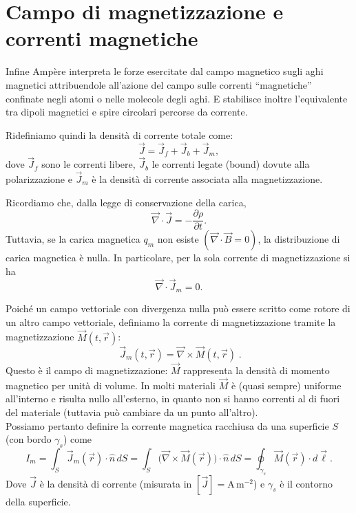 \documentclass{book}
\begin{document}
\section{Campo di magnetizzazione e correnti magnetiche}

Infine Ampère interpreta le forze esercitate dal campo magnetico sugli aghi magnetici attribuendole all'azione del campo sulle correnti ``magnetiche'' confinate negli atomi o nelle molecole degli aghi. E stabilisce inoltre l'equivalente tra dipoli magnetici e spire circolari percorse da corrente.

Ridefiniamo quindi la densità di corrente totale come:
\[
\vec{J} = \vec{J}_{\!f} + \vec{J}_{\!b} + \vec{J}_{\!m},
\]
dove \(\vec{J}_{\!f}\) sono le correnti libere, \(\vec{J}_{\!b}\) le correnti legate (bound) dovute alla polarizzazione e \(\vec{J}_{\!m}\) è la densità di corrente associata alla magnetizzazione.

Ricordiamo che, dalla legge di conservazione della carica,
\[
\vec{\nabla}\cdot\vec{J} = -\frac{\partial \rho}{\partial t}.
\]
Tuttavia, se la carica magnetica \(q_m\) non esiste $\left( \vec{\nabla} \cdot \vec{B}=0 \right)$, la distribuzione di carica magnetica è nulla. In particolare, per la sola corrente di magnetizzazione si ha
\[
\vec{\nabla}\cdot\vec{J}_{\!m} = 0.
\]

Poiché un campo vettoriale con divergenza nulla può essere scritto come rotore di un altro campo vettoriale, definiamo la corrente di magnetizzazione tramite la magnetizzazione \(\vec{M}(t,\vec{r})\):
\[
\boxed{\;\vec{J}_{\!m}(t,\vec{r}) = \vec{\nabla}\times\vec{M}(t,\vec{r})\;}.
\]
Questo è il campo di magnetizzazione: \(\vec{M}\) rappresenta la densità di momento magnetico per unità di volume. In molti materiali \(\vec{M}\) è (quasi sempre) uniforme all'interno e risulta nullo all'esterno, in quanto non si hanno correnti al di fuori del materiale (tuttavia può cambiare da un punto all'altro).
\\
Possiamo pertanto definire la corrente magnetica racchiusa da una superficie \(S\) (con bordo \(\gamma_s\)) come
\[
I_m = \int_{S}\vec{J}_{\!m}(\vec{r})\cdot\hat{n}\,dS
= \int_{S}\bigl(\vec{\nabla}\times\vec{M}(\vec{r})\bigr)\cdot\hat{n}\,dS
= \oint_{\gamma_s}\vec{M}(\vec{r})\cdot d\vec{\ell}.
\]
Dove \(\vec{J}\) è la densità di corrente (misurata in \([ \vec{J} ] = \mathrm{A\,m^{-2}}\)) e \(\gamma_s\) è il contorno della superficie.
\end{document}
